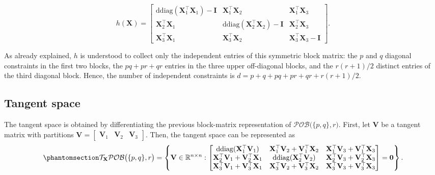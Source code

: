 \documentclass[
  12pt,
  letterpaper,
  article]{scrartcl}
\begin{document}
\[
h(\mathbf{X})
=
\begin{bmatrix}
\mathrm{ddiag}(\mathbf{X}_1^\top\mathbf{X}_1)-\mathbf{I}
&
\mathbf{X}_1^\top\mathbf{X}_2
&
\mathbf{X}_1^\top\mathbf{X}_3
\\
\mathbf{X}_2^\top\mathbf{X}_1
&
\mathrm{ddiag}(\mathbf{X}_2^\top\mathbf{X}_2)-\mathbf{I}
&
\mathbf{X}_2^\top\mathbf{X}_3
\\
\mathbf{X}_3^\top\mathbf{X}_1
&
\mathbf{X}_3^\top\mathbf{X}_2
&
\mathbf{X}_3^\top\mathbf{X}_3-\mathbf{I}
\end{bmatrix}.
\]

As already explained, \(h\) is understood to collect only the
independent entries of this symmetric block matrix: the \(p\) and \(q\)
diagonal constraints in the first two blocks, the \(pq+pr+qr\) entries
in the three upper off-diagonal blocks, and the \(r(r+1)/2\) distinct
entries of the third diagonal block. Hence, the number of independent
constraints is \(d = p+q+pq+pr+qr+ r(r+1)/2\).

\subsection{Tangent space}\label{tangent-space}

The tangent space is obtained by differentiating the previous
block-matrix representation of \(\mathcal{POB}\big(\{p,q\}, r\big)\).
First, let \(\mathbf{V}\) be a tangent matrix with partitions
\(\mathbf{V} = \begin{bmatrix} \mathbf{V}_1 & \mathbf{V}_2 & \mathbf{V}_3 \end{bmatrix}.\)
Then, the tangent space can be represented as
\begin{equation}\protect\phantomsection\label{eq-pob_tangent_space}{
\mathcal{T}_{\mathbf{X}}
\mathcal{POB}\big(\{p,q\},r\big)
= \left\{ 
\mathbf{V}\in\mathbb{R}^{n\times n}:
\begin{bmatrix}
\mathrm{ddiag}(\mathbf{X}_1^\top\mathbf{V}_1)
&
\mathbf{X}_1^\top\mathbf{V}_2+
\mathbf{V}_1^\top\mathbf{X}_2
&
\mathbf{X}_1^\top\mathbf{V}_3+
\mathbf{V}_1^\top\mathbf{X}_3
\\
\mathbf{X}_2^\top\mathbf{V}_1+
\mathbf{V}_2^\top\mathbf{X}_1
&
\mathrm{ddiag}(\mathbf{X}_2^\top\mathbf{V}_2)
&
\mathbf{X}_2^\top\mathbf{V}_3+
\mathbf{V}_2^\top\mathbf{X}_3
\\
\mathbf{X}_3^\top\mathbf{V}_1+
\mathbf{V}_3^\top\mathbf{X}_1
&
\mathbf{X}_3^\top\mathbf{V}_2+
\mathbf{V}_3^\top\mathbf{X}_2
&
\mathbf{X}_3^\top\mathbf{V}_3+
\mathbf{V}_3^\top\mathbf{X}_3
\end{bmatrix}
=
\mathbf{0}
\right\}.
}\end{equation}
\end{document}
